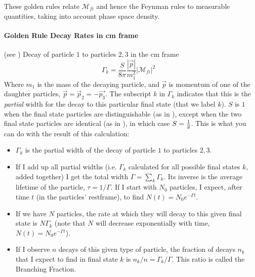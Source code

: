 These golden rules relate $\mathcal{M}_{fi}$ and hence the Feynman rules to measurable quantities, taking into account phase space density. 
\paragraph{Golden Rule Decay Rates in cm frame}
(see )
Decay of particle $1$ to particles $2, 3$ in the cm frame 
\begin{equation}
\Gamma_k = \frac{S}{8\pi} \frac{|\vec{p}|}{m_1^2} \left|\mathcal{M}_{fi}\right|^2
\end{equation}
Where $m_1$ is the mass of the decaying particle, and $\vec{p}$ is momentum of one of the daughter particles, $\vec{p} = \vec{p}_2 = -\vec{p_3}$. The subscript $k$ in $\Gamma_k$ indicates that this is the \emph{partial} width for the decay to this particular final state (that we label $k$). $S$ is $1$ when the final state particles are distinguishable (as in \prt{\pi^+ \to \mu^+ \nu_{\mu}}), except when the two final state particles are identical (as in \prt{\pi^0 \to \gamma \gamma}), in which case $S = \frac{1}{2}$.
This is what you can do with the result of this calculation:
\begin{itemize}
\item $\Gamma_k$ is the partial width of the decay of particle $1$ to particles $2, 3$.
\item If I add up all partial widths (i.e. $\Gamma_k$ calculated for all possible final states $k$, added together) I get the total width $\Gamma = \sum_k \Gamma_k$. Its inverse is the average lifetime of the particle, $\tau = 1/\Gamma$. If I start with $N_0$ particles, I expect, after time $t$ (in the particles' restframe), to find $N(t) = N_0 e^{-\Gamma t}$.
\item If we have $N$ particles, the rate at which they will decay to this given final state is $N\Gamma_k$ (note that $N$ will decrease exponentially with time, $N(t) = N_0 e^{-\Gamma t}$).
\item If I observe $n$ decays of this given type of particle, the fraction of decays $n_k$ that I expect to find in final state $k$ is $n_k/n = \Gamma_k/\Gamma$. This ratio is called the Branching Fraction.
\end{itemize}


